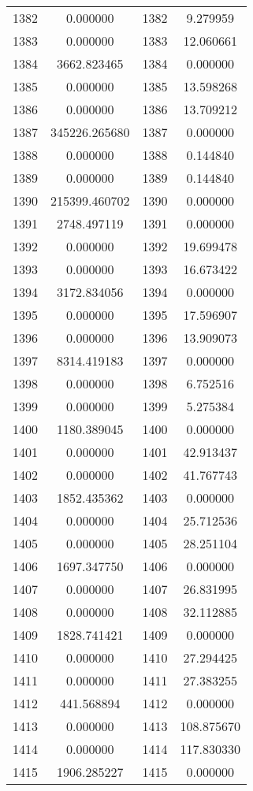 \documentclass[12pt]{article}
\begin{document}
\begin{longtable}{@{}cccc@{}}
1382 & 0.000000 & 1382 & 9.279959 \\
1383 & 0.000000 & 1383 & 12.060661 \\
1384 & 3662.823465 & 1384 & 0.000000 \\
1385 & 0.000000 & 1385 & 13.598268 \\
1386 & 0.000000 & 1386 & 13.709212 \\
1387 & 345226.265680 & 1387 & 0.000000 \\
1388 & 0.000000 & 1388 & 0.144840 \\
1389 & 0.000000 & 1389 & 0.144840 \\
1390 & 215399.460702 & 1390 & 0.000000 \\
1391 & 2748.497119 & 1391 & 0.000000 \\
1392 & 0.000000 & 1392 & 19.699478 \\
1393 & 0.000000 & 1393 & 16.673422 \\
1394 & 3172.834056 & 1394 & 0.000000 \\
1395 & 0.000000 & 1395 & 17.596907 \\
1396 & 0.000000 & 1396 & 13.909073 \\
1397 & 8314.419183 & 1397 & 0.000000 \\
1398 & 0.000000 & 1398 & 6.752516 \\
1399 & 0.000000 & 1399 & 5.275384 \\
1400 & 1180.389045 & 1400 & 0.000000 \\
1401 & 0.000000 & 1401 & 42.913437 \\
1402 & 0.000000 & 1402 & 41.767743 \\
1403 & 1852.435362 & 1403 & 0.000000 \\
1404 & 0.000000 & 1404 & 25.712536 \\
1405 & 0.000000 & 1405 & 28.251104 \\
1406 & 1697.347750 & 1406 & 0.000000 \\
1407 & 0.000000 & 1407 & 26.831995 \\
1408 & 0.000000 & 1408 & 32.112885 \\
1409 & 1828.741421 & 1409 & 0.000000 \\
1410 & 0.000000 & 1410 & 27.294425 \\
1411 & 0.000000 & 1411 & 27.383255 \\
1412 & 441.568894 & 1412 & 0.000000 \\
1413 & 0.000000 & 1413 & 108.875670 \\
1414 & 0.000000 & 1414 & 117.830330 \\
1415 & 1906.285227 & 1415 & 0.000000 \\

\end{longtable}
\end{document}
